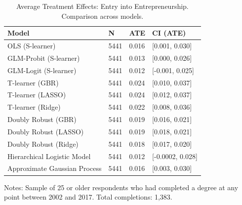 \documentclass[12pt, a4paper]{article}
\begin{document}
\singlespacing
\begin{table}[htbp]
\centering
\small
\caption{Average Treatment Effects: Entry into Entrepreneurship. Comparison across models.}
\begin{tabular}{p{} C{0.1\textwidth} C{0.1\textwidth} C{0.2\textwidth}}
\toprule
Model  &  N  &  ATE  &  CI (ATE)  \\
\midrule 	   						
OLS (S-learner)	 & 5441 & 0.016 & [0.001, 0.030] \\
GLM-Probit (S-learner)	 & 5441 & 0.013 & [0.000, 0.026] \\
GLM-Logit (S-learner)	 & 5441 & 0.012 & [-0.001, 0.025] \\
T-learner (GBR) & 5441 & 0.024 & [0.010, 0.037]	 \\
T-learner (LASSO) & 5441 & 0.024 & [0.012, 0.037]	 \\
T-learner (Ridge)	 & 5441 & 0.022 & [0.008, 0.036]	 \\
Doubly Robust (GBR) & 5441 & 0.019 & [0.016, 0.021] \\
Doubly Robust (LASSO) & 5441 & 0.019 & [0.018, 0.021]	 \\
Doubly Robust (Ridge)	 & 5441 & 0.018 & [0.017, 0.020]	 \\
Hierarchical Logistic Model	 & 5441 & 0.012 & [-0.0002, 0.028]  \\
Approximate Gaussian Process  & 5441 & 0.016 & [0.003, 0.030] \\
\bottomrule
\end{tabular}
\par\medskip
\parbox{1.0\textwidth}{\footnotesize Notes: Sample of 25 or older respondents who had completed a degree at any point between 2002 and 2017. Total completions: 1,383.}
\label{tab:atebsentrep}
\end{table}
\doublespacing
\end{document}
